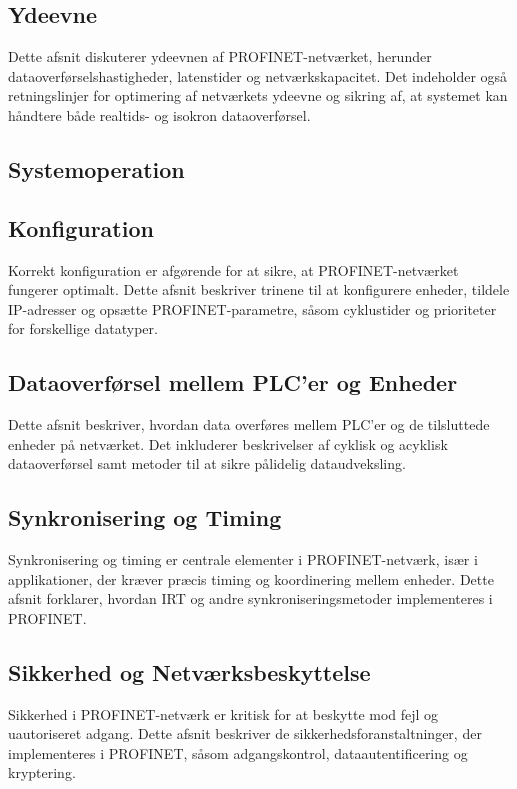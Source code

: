 \subsection{Ydeevne}
Dette afsnit diskuterer ydeevnen af PROFINET-netværket, herunder dataoverførselshastigheder, latenstider og netværkskapacitet. Det indeholder også retningslinjer for optimering af netværkets ydeevne og sikring af, at systemet kan håndtere både realtids- og isokron dataoverførsel.

\subsection{Systemoperation}
\subsection*{Konfiguration}
Korrekt konfiguration er afgørende for at sikre, at PROFINET-netværket fungerer optimalt. Dette afsnit beskriver trinene til at konfigurere enheder, tildele IP-adresser og opsætte PROFINET-parametre, såsom cyklustider og prioriteter for forskellige datatyper.

\subsection*{Dataoverførsel mellem PLC'er og Enheder}
Dette afsnit beskriver, hvordan data overføres mellem PLC'er og de tilsluttede enheder på netværket. Det inkluderer beskrivelser af cyklisk og acyklisk dataoverførsel samt metoder til at sikre pålidelig dataudveksling.

\subsection*{Synkronisering og Timing}
Synkronisering og timing er centrale elementer i PROFINET-netværk, især i applikationer, der kræver præcis timing og koordinering mellem enheder. Dette afsnit forklarer, hvordan IRT og andre synkroniseringsmetoder implementeres i PROFINET.

\subsection*{Sikkerhed og Netværksbeskyttelse}
Sikkerhed i PROFINET-netværk er kritisk for at beskytte mod fejl og uautoriseret adgang. Dette afsnit beskriver de sikkerhedsforanstaltninger, der implementeres i PROFINET, såsom adgangskontrol, dataautentificering og kryptering.


